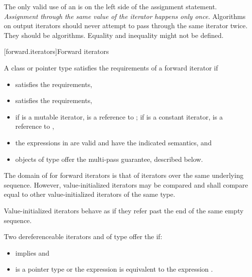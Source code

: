 \pnum
\begin{note}
The only valid use of an
is on the left side of the assignment statement.
\textit{Assignment through the same value of the iterator happens only once.}
Algorithms on output iterators should never attempt to pass through the same iterator twice.
They should be
algorithms.
Equality and inequality might not be defined.
\end{note}

[forward.iterators]{Forward iterators}

\pnum
A class or pointer type
satisfies the requirements of a forward iterator if

\begin{itemize}
\item {} satisfies the  requirements,

\item {} satisfies the 
requirements,

\item if  is a mutable iterator,  is a reference to ;
if  is a constant iterator,  is a reference to ,

\item the expressions in 
are valid and have the indicated semantics, and

\item objects of type  offer the multi-pass guarantee, described below.
\end{itemize}

\pnum
The domain of \tcode{==} for forward iterators is that of iterators over the same
underlying sequence. However, value-initialized iterators may be compared and
shall compare equal to other value-initialized iterators of the same type.
\begin{note} Value-initialized iterators behave as if they refer past the end of
the same empty sequence. \end{note}

\pnum
Two dereferenceable iterators  and  of type  offer the
 if:

\begin{itemize}
\item {} implies  and
\item {} is a pointer type or the expression
 is equivalent to the expression .
\end{itemize}

